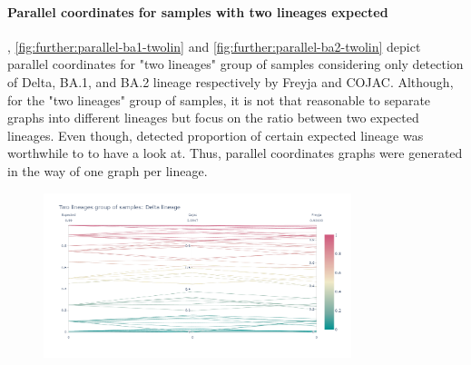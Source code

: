         \paragraph{Parallel coordinates for samples with two lineages expected} \label{sec:appendix:figures:parallel-twolin}
        , \cref{fig:further:parallel-ba1-twolin} and \cref{fig:further:parallel-ba2-twolin} depict parallel coordinates for "two lineages" group of samples considering only detection of Delta, BA.1, and BA.2 lineage respectively by Freyja and COJAC. Although, for the "two lineages" group of samples, it is not that reasonable to separate graphs into different lineages but focus on the ratio between two expected lineages. Even though, detected proportion of certain expected lineage was worthwhile to to have a look at. Thus, parallel coordinates graphs were generated in the way of one graph per lineage.
        \begin{figure}[H]
        	\centering
            \includegraphics[width=0.8\textwidth]{figures/further/pc-twolin-delta.png}
            \label{fig:further:parallel-delta-twolin}
        \end{figure}
